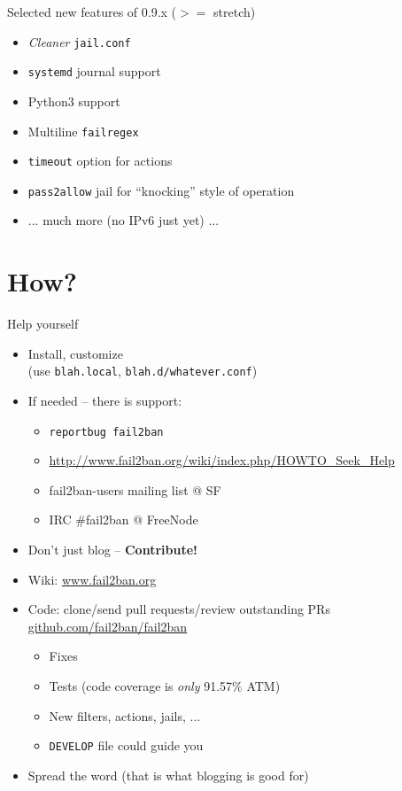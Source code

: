 \documentclass[]{beamer}
\begin{document}
\begin{frame}{Selected new features of 0.9.x ($>=$ stretch)}
\begin{itemize}
\item \emph{Cleaner} \texttt{jail.conf}
\item \texttt{systemd} journal support
\item Python3 support
\item Multiline \texttt{failregex}
\item \texttt{timeout} option for actions
\item \texttt{pass2allow} jail for ``knocking'' style of operation
\item ... much more (no IPv6 just yet) ...
\end{itemize}
\end{frame}

\section{How?}

\begin{frame}[fragile]{Help yourself }
  \begin{itemize}
    \item Install, customize\\
      (use \texttt{blah.local}, \texttt{blah.d/whatever.conf})
    \item If needed -- there is support:
      \begin{itemize}
      \item \texttt{reportbug fail2ban}
      \item \url{http://www.fail2ban.org/wiki/index.php/HOWTO_Seek_Help}
      \item fail2ban-users mailing list @ SF
      \item IRC \#fail2ban @ FreeNode \pause
      \end{itemize}
    \item \alert{Don't just blog -- \textbf{Contribute!}}
    \item Wiki: \href{http://www.fail2ban.org}{www.fail2ban.org}
    \item Code: clone/send pull requests/review outstanding PRs
      \href{http://github.com/fail2ban/fail2ban/pulls}{github.com/fail2ban/fail2ban}
      \begin{itemize}
      \item Fixes
      \item Tests (code coverage is \emph{only} 91.57\% ATM)
      \item New filters, actions, jails, ...
      \item \texttt{DEVELOP} file could guide you
      \end{itemize}
  \item Spread the word (\alert{that is what blogging is good for})
  \end{itemize}
\end{frame}
\end{document}
